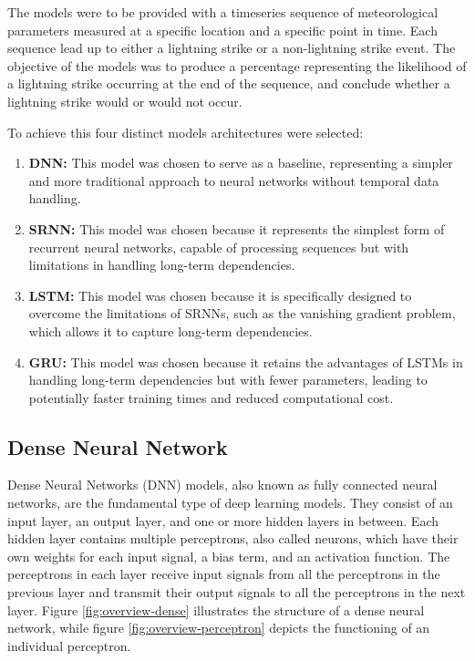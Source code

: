 The models were to be provided with a timeseries sequence of meteorological parameters measured at a specific location and a specific point in time. Each sequence lead up to either a lightning strike or a non-lightning strike event. The objective of the models was to produce a percentage representing the likelihood of a lightning strike occurring at the end of the sequence, and conclude whether a lightning strike would or would not occur.

To achieve this four distinct models architectures were selected:

\begin{enumerate}
	\item \textbf{DNN:} This model was chosen to serve as a baseline, representing a simpler and more traditional approach to neural networks without temporal data handling.
	\item \textbf{SRNN:} This model was chosen because it represents the simplest form of recurrent neural networks, capable of processing sequences but with limitations in handling long-term dependencies.
	\item \textbf{LSTM:} This model was chosen because it is specifically designed to overcome the limitations of SRNNs, such as the vanishing gradient problem, which allows it to capture long-term dependencies.
	\item \textbf{GRU:} This model was chosen because it retains the advantages of LSTMs in handling long-term dependencies but with fewer parameters, leading to potentially faster training times and reduced computational cost.
\end{enumerate}

\subsection{Dense Neural Network}
\label{sec:model-selection-dnn}

Dense Neural Networks (DNN) models, also known as fully connected neural networks, are the fundamental type of deep learning models. They consist of an input layer, an output layer, and one or more hidden layers in between. Each hidden layer contains multiple perceptrons, also called neurons, which have their own weights for each input signal, a bias term, and an activation function. The perceptrons in each layer receive input signals from all the perceptrons in the previous layer and transmit their output signals to all the perceptrons in the next layer. Figure \ref{fig:overview-dense} illustrates the structure of a dense neural network, while figure \ref{fig:overview-perceptron} depicts the functioning of an individual perceptron.

